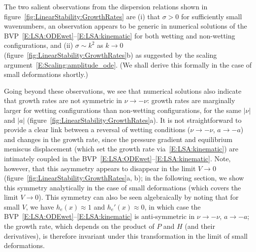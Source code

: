 \documentclass{jfm}
\newcommand{\blue}[1]{{\color{blue} #1}}
\newcommand{\aspect}{a} %
\begin{document}

The two salient observations from the dispersion relations shown in figure~\ref{fig:LinearStability:GrowthRates} are (i) that $\sigma > 0$ for sufficiently small wavenumbers, an observation appears to be generic in numerical solutions of the BVP~\eqref{E:LSA:ODEwet}--\eqref{E:LSA:kinematic} for both wetting and non-wetting configurations, and (ii) $\sigma\sim k^2$ as $k \to 0$ (figure~\ref{fig:LinearStability:GrowthRates}b) as suggested by the scaling argument~\eqref{E:Scaling:amplitude_ode}. (We shall derive this formally in the case of small deformations shortly.)

Going beyond these observations, we see that numerical solutions also indicate that growth rates are not symmetric in $\nu \to -\nu$: growth rates are marginally larger for wetting configurations than non-wetting configurations, for the same $|\nu|$ and $|\aspect|$ (figure~\ref{fig:LinearStability:GrowthRates}a). It is not straightforward to provide a clear link between a reversal of wetting conditions ($\nu \to -\nu$, $a \to -a$) and changes in the growth rate, since the pressure gradient and equilibrium meniscus displacement (which set the growth rate via~\eqref{E:LSA:kinematic}) are intimately coupled in the BVP~\eqref{E:LSA:ODEwet}--\eqref{E:LSA:kinematic}. Note, however, that this asymmetry appears to disappear in the limit $V \to 0$ (figure~\ref{fig:LinearStability:GrowthRates}a, b); in the following section, we show this symmetry analytically in the case of small deformations (which covers the limit $V \to 0$). This symmetry can also be seen algebraically by noting that for small $V$, we have $h_e(x)\approx 1$ and $h_e'(x) \approx 0$, in which case the BVP~\eqref{E:LSA:ODEwet}--\eqref{E:LSA:kinematic} is anti-symmetric in $\nu \to -\nu$, $a \to -a$; the growth rate, which depends on the product of $P$ and $H$ (and their derivatives), is therefore invariant under this transformation in the limit of small deformations. %
\end{document}
